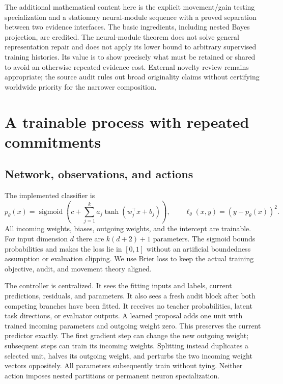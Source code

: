 \documentclass[11pt]{article}
\theoremstyle{remark}\newtheorem{remark}[theorem]{Remark}
\begin{document}
The additional mathematical content here is the explicit movement/gain
testing specialization and a stationary neural-module sequence with a
proved separation between two evidence interfaces. The basic ingredients,
including nested Bayes projection, are credited. The neural-module theorem
does not solve general representation repair and does not apply its lower
bound to arbitrary supervised training histories. Its value is to show
precisely what must be retained or shared to avoid an otherwise repeated
evidence cost. External novelty review remains appropriate; the source audit
rules out broad originality claims without certifying worldwide priority
for the narrower composition.



\section{A trainable process with repeated commitments}
\label{sec:method}
\subsection{Network, observations, and actions}
The implemented classifier is
\begin{equation}
 p_\theta(x)=\operatorname{sigmoid}\!\left(c+\sum_{j=1}^k
 a_j\tanh(w_j^\top x+b_j)\right),\qquad
 \ell_\theta(x,y)=(y-p_\theta(x))^2.
 \label{eq:network}
\end{equation}
All incoming weights, biases, outgoing weights, and the intercept are
trainable. For input dimension $d$ there are $k(d+2)+1$ parameters.
The sigmoid bounds probabilities and makes the loss lie in $[0,1]$ without
an artificial boundedness assumption or evaluation clipping. We use Brier
loss to keep the actual training objective, audit, and movement theory aligned.

The controller is centralized. It sees the fitting inputs and labels,
current predictions, residuals, and parameters. It also sees a fresh audit
block after both competing branches have been fitted. It receives no teacher
probabilities, latent task directions, or evaluator outputs. A learned
proposal adds one unit with trained incoming parameters and outgoing weight
zero. This preserves the current predictor exactly. The first gradient step
can change the new outgoing weight; subsequent steps can train its incoming
weights. Splitting instead duplicates a selected unit, halves its outgoing
weight, and perturbs the two incoming weight vectors oppositely. All
parameters subsequently train without tying. Neither action imposes nested
partitions or permanent neuron specialization.
\end{document}
